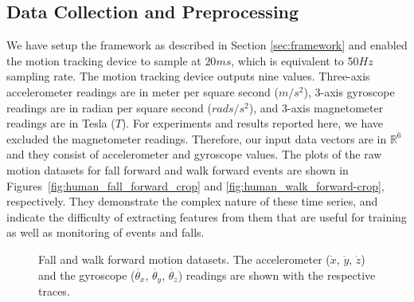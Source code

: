 \documentclass[]{IEEEtran}
\begin{document}
\subsection{Data Collection and Preprocessing  }
\label{subsec:preDataCollection}

We have setup the framework as described in Section \ref{sec:framework} and enabled the 
motion tracking device to sample at $20ms$, which is equivalent to 50$Hz$ 
sampling rate. The motion tracking device outputs nine values. Three-axis  
accelerometer readings are in  meter per square second ($m/s^2$), 3-axis gyroscope readings are 
in radian per square second ($rads/s^2$), and  3-axis magnetometer readings are  in 
Tesla ($T$). For experiments  and results reported here, we have excluded the magnetometer readings. Therefore, 
our input data vectors  are in $\mathbb{R}^6$ and they consist of accelerometer and 
gyroscope values. The plots of the raw motion datasets for fall forward and  walk forward 
events 
are shown in Figures~\ref{fig:human_fall_forward_crop} and 
\ref{fig:human_walk_forward-crop}, respectively. They demonstrate the complex nature of 
these time series, and indicate the difficulty of extracting features from them that are 
useful for training as well as monitoring of events and falls.


\begin{figure}
\centering
  \mbox{}
  \mbox{}
  \caption{Fall and walk forward motion datasets. The accelerometer ($\dot{x}$, 
  $\dot{y}$, $\dot{z}$) and the gyroscope ($\dot{\theta_x}$, 
  $\dot{\theta_y}$, $\dot{\theta_z}$) readings are shown with the respective traces. }
\end{figure}
\end{document}
